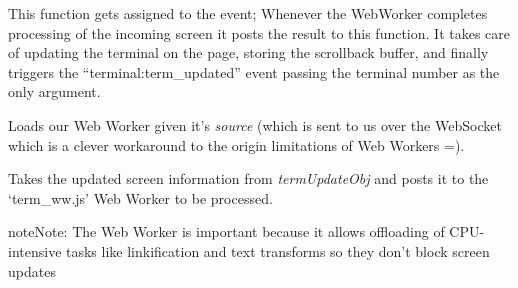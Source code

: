 \documentclass[letterpaper,10pt,openany]{sphinxmanual}
\begin{document}

\begin{fulllineitems}
\label{Applications/terminal/js_terminal:GateOne.Terminal.termUpdateFromWorker}
This function gets assigned to the  event; Whenever the WebWorker completes processing of the incoming screen it posts the result to this function.  It takes care of updating the terminal on the page, storing the scrollback buffer, and finally triggers the ``terminal:term\_updated'' event passing the terminal number as the only argument.

\end{fulllineitems}


\begin{fulllineitems}
\label{Applications/terminal/js_terminal:GateOne.Terminal.loadWebWorkerAction}
Loads our Web Worker given it's \emph{source} (which is sent to us over the WebSocket which is a clever workaround to the origin limitations of Web Workers =).

\end{fulllineitems}


\begin{fulllineitems}
\label{Applications/terminal/js_terminal:GateOne.Terminal.updateTerminalAction}
Takes the updated screen information from \emph{termUpdateObj} and posts it to the `term\_ww.js' Web Worker to be processed.

\begin{notice}{note}{Note:}
The Web Worker is important because it allows offloading of CPU-intensive tasks like linkification and text transforms so they don't block screen updates
\end{notice}

\end{fulllineitems}

\end{document}
